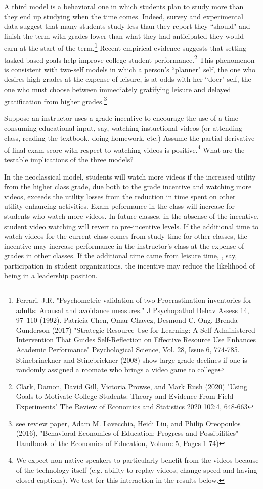 \documentclass[12pt]{article}
\begin{document}
A third model is a behavioral one in which students plan to study more than they end up studying when the time comes. Indeed, survey and experimental data suggest that many students study less than they report they ``should" and finish the term with grades lower than what they had anticipated they would earn at the start of the term.\footnote{Ferrari, J.R. "Psychometric validation of two Procrastination inventories for adults: Arousal and avoidance measures." J Psychopathol Behav Assess 14, 97–110 (1992). Patricia Chen, Omar Chavez, Desmond C. Ong, Brenda Gunderson (2017) "Strategic Resource Use for Learning: A Self-Administered Intervention That Guides Self-Reflection on Effective Resource Use Enhances Academic Performance" Psychological Science, Vol. 28, Issue 6, 774-785.  Stinebrinckner and Stinebrickner (2008) show large grade declines if one is randomly assigned a roomate who brings a video game to college} Recent empirical evidence suggests that setting tasked-based goals help improve college student performance.\footnote{Clark, Damon, David Gill, Victoria Prowse, and Mark Rush (2020) "Using Goals to Motivate College Students: Theory and Evidence From Field Experiments" The Review of Economics and Statistics 2020 102:4, 648-663} This phenomenon is consistent with two-self models in which a person's ``planner" self, the one who desires high grades at the expense of leisure, is at odds with her ``doer" self, the one who must choose between immediately gratifying leisure and delayed gratification from higher grades.\footnote{see review paper, Adam M. Lavecchia, Heidi Liu, and Philip Oreopoulos (2016), "Behavioral Economics of Education: Progress and Possibilities"  Handbook of the Economics of Education, Volume 5, Pages 1-74)} 

Suppose an instructor uses a grade incentive to encourage the use of a time consuming educational input, say, watching instuctional videos (or attending class, reading the textbook, doing homework, etc.) Assume the partial derivative of final exam score with respect to watching videos is positive.\footnote{We expect non-native speakers to particularly benefit from the videos because of the technology itself (e.g. ability to replay videos, change speed and having closed captions). We test for this interaction in the results below.}  What are the testable implications of the three models? 

In the neoclassical model, students will watch more videos if the increased utility from the higher class grade, due both to the grade incentive and watching more videos, exceeds the utility losses from the reduction in time spent on other utility-enhancing activities.  Exam peformance in the class will increase for students who watch more videos. In future classes, in the absense of the incentive, student video watching will revert to pre-incentive levels.  If the additional time to watch videos for the current class comes from study time for other classes, the incentive may increase performance in the instructor's class at the expense of grades in other classes. If the additional time came from leisure time,  , say, participation in student organizations, the incentive may reduce the likelihood of being in a leadership position.   
\end{document}
